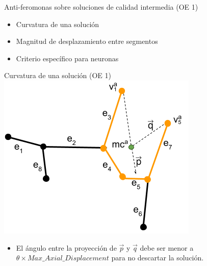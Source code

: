 \begin{frame}{Anti-feromonas sobre soluciones de calidad intermedia (OE 1)}
\begin{itemize}
    \item Curvatura de una soluci\'on
    \item Magnitud de desplazamiento entre segmentos
    \item Criterio espec\'ifico para neuronas
\end{itemize}
\end{frame}

\begin{frame}{Curvatura de una soluci\'on (OE 1)}
\centering
    \includegraphics[scale=0.5]{Pictures/ant_curvature_case.png}
    \begin{itemize}
        \item El \'angulo entre la proyecci\'on de $\Vec{p}$ y $\Vec{q}$ debe ser menor a $\theta \times Max\_Axial\_Displacement$ para no descartar la soluci\'on.
    \end{itemize}
\end{frame}

